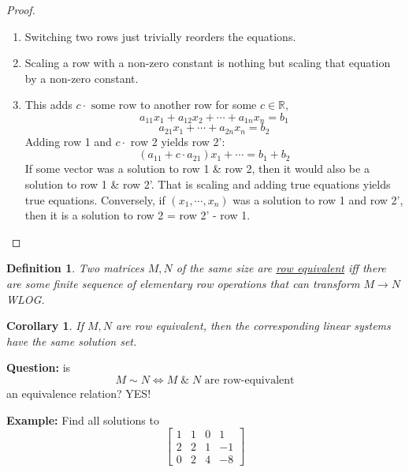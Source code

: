 \documentclass{article}
\newtheorem{definition}[theorem]{Definition}
\newtheorem{corollary}[theorem]{Corollary}
\newtheorem{one minute paper}[theorem]{One Minute Paper}
\begin{document}
\begin{proof}
    \begin{enumerate}
        \item Switching two rows just trivially reorders the equations. 
        \item Scaling a row with a non-zero constant is nothing but scaling that equation by a non-zero constant.
        \item This adds $c\cdot \text{ some row}$ to another row for some $c \in \mathbb{R}$, 
        \begin{equation}
            a_{11}x_1 + a_{12}x_2 + \cdots + a_{1n}x_n = b_1
        \end{equation}
        \begin{equation}
            a_{21}x_1 + \cdots + a_{2n}x_n = b_2
        \end{equation}
        Adding row 1 and $c \cdot$ row 2 yields row 2':
        \begin{equation}
            (a_{11}+ c\cdot a_{21})x_1 + \cdots = b_1 + b_2
        \end{equation}
        If some vector was a solution to row 1 \& row 2, then it would also be a solution to row 1 \& row 2'. That is scaling and adding true equations yields true equations. 
        Conversely, if $(x_1, \cdots, x_n)$ was a solution to row 1 and row 2', then it is a solution to row 2 = row 2' - row 1. 
    \end{enumerate}
\end{proof}

\begin{definition}
    Two matrices $M,N$ of the same size are \underline{row equivalent} iff there are some finite sequence of elementary row operations that can transform $M \rightarrow N$ WLOG. 
\end{definition}

\begin{corollary}
    If $M,N$ are row equivalent, then the corresponding linear systems have the same solution set. 
\end{corollary}

\textbf{Question:} is 
\begin{equation}
    M \sim N \iff M \; \& \; N \text{ are row-equivalent}
\end{equation}
an equivalence relation? YES!

\textbf{Example:} Find all solutions to 
\[\left[
\begin{array}{ccc|c}
    1 & 1 & 0 & 1 \\
    2 & 2 & 1 & -1 \\
    0 & 2 & 4 & -8
\end{array}
\right]\]
\end{document}
